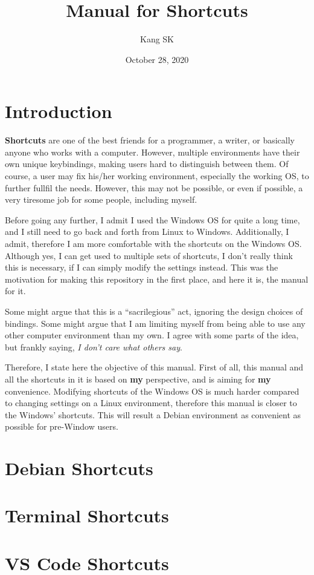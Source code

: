 \documentclass[10pt]{article}
\title{Manual for Shortcuts}
\author{Kang SK}
\date{October 28, 2020}
\begin{document}
\setlength{\parskip}{\baselineskip}

\maketitle\label{title}
\tableofcontents\label{tableofcontents}
\newpage

\section*{Introduction} \label{S_Introduction}

\textbf{Shortcuts} are one of the best friends for a programmer, a writer, or basically anyone who works with a computer.
However, multiple environments have their own unique keybindings, making users hard to distinguish between them.
Of course, a user may fix his/her working environment, especially the working OS, to further fullfil the needs.
However, this may not be possible, or even if possible, a very tiresome job for some people, including myself.

Before going any further, I admit I used the Windows OS for quite a long time, and I still need to go back and forth from Linux to Windows.
Additionally, I admit, therefore I am more comfortable with the shortcuts on the Windows OS.
Although yes, I can get used to multiple sets of shortcuts, I don't really think this is necessary, if I can simply modify the settings instead.
This was the motivation for making this repository in the first place, and here it is, the manual for it.

Some might argue that this is a ``sacrilegious'' act, ignoring the design choices of bindings.
Some might argue that I am limiting myself from being able to use any other computer environment than my own.
I agree with some parts of the idea, but frankly saying, \emph{I don't care what others say}.

Therefore, I state here the objective of this manual.
First of all, this manual and all the shortcuts in it is based on \textbf{my} perspective, and is aiming for \textbf{my} convenience.
Modifying shortcuts of the Windows OS is much harder compared to changing settings on a Linux environment, therefore this manual is closer to the Windows' shortcuts.
This will result a Debian environment as convenient as possible for pre-Window users.
\newpage


\section{Debian Shortcuts} \label{S_Debain} 



\section{Terminal Shortcuts} \label{S_Terminal}

\section{VS Code Shortcuts} \label{S_VSCode}
\end{document}
